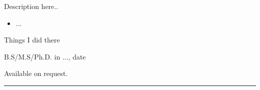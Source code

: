 \documentclass[10pt]{article}
\begin{document}
\begin{llist}
\noindent
Description here..
\begin{itemize}
\item ...
\end{itemize}

% 
\noindent
Things I did there

\nocite{hohn01}


B.S/M.S/Ph.D. in ..., date

Available on request.  
\end{llist}

%
\noindent\rule{\linewidth}{.005in}
%
\end{document}
